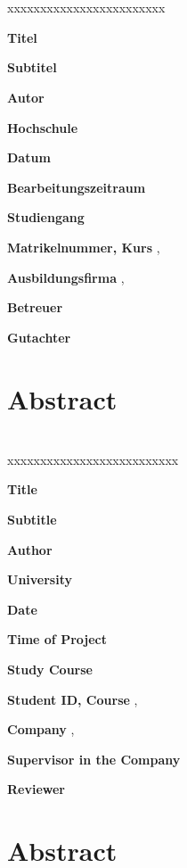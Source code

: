 \section*{\reporttype}

\begin{xlist}{xxxxxxxxxxxxxxxxxxxxxxxx} 
  		\item[\textbf{Titel}]        			\reporttitle
		\item[\textbf{Subtitel}]          		\reportsubtitle
		\item[\textbf{Autor}]          			\student
		\item[\textbf{Hochschule}]          	\dhbw
		\item[\textbf{Datum}]          			\handoverdate
		\item[\textbf{Bearbeitungszeitraum}] 	\timerange
		\item[\textbf{Studiengang}]          	\studiengang
		\item[\textbf{Matrikelnummer, Kurs}]  	\matrikel, \kurs
		\item[\textbf{Ausbildungsfirma}]      	\company, \lokation
		\item[\textbf{Betreuer}]   				\tutor
		\item[\textbf{Gutachter}]            	\prof
\end{xlist}
 	
\section*{Abstract}
\begin{german}

\end{german}

\clearpage

\section*{\reporttype}

\begin{xlist}{xxxxxxxxxxxxxxxxxxxxxxxxxx} 
  		\item[\textbf{Title}]        			 	\reporttitle
		\item[\textbf{Subtitle}]          		 	\reportsubtitle
		\item[\textbf{Author}]          		 	\student
		\item[\textbf{University}]          	 	\dhbw
		\item[\textbf{Date}]          		 	   	\handoverdate
		\item[\textbf{Time of Project}]             \timerange
		\item[\textbf{Study Course}]          	 	\studiengang
		\item[\textbf{Student ID, Course}]  		\matrikel, \kurs
		\item[\textbf{Company}]      			   	\company, \lokation
		\item[\textbf{Supervisor in the Company}]   \tutor
		\item[\textbf{Reviewer}]            		\prof
\end{xlist}
 	
\section*{Abstract}
